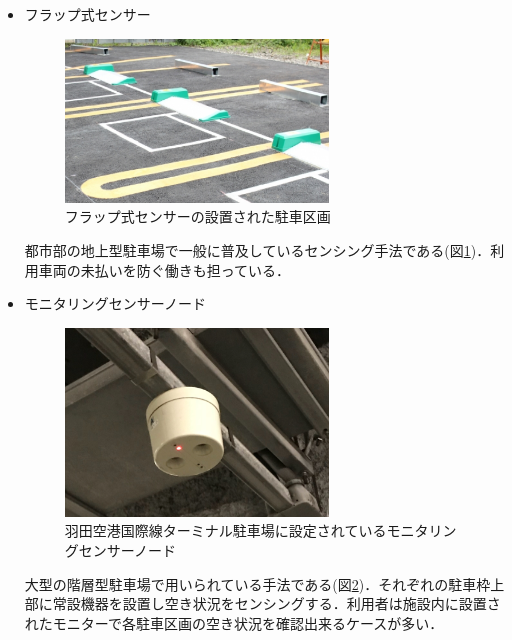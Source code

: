 \begin{itemize}
					
	\item フラップ式センサー\\
	      \begin{figure}
	      	\centering
	      	\includegraphics[width=7cm]{fig/flap.png}
	      	\caption{フラップ式センサーの設置された駐車区画\protect \footnotemark}
	      	\label{flap}
	      \end{figure}
	      都市部の地上型駐車場で一般に普及しているセンシング手法である(図\ref{flap})．利用車両の未払いを防ぐ働きも担っている．
	      	      	      	      	      
	\item モニタリングセンサーノード\\
	      \begin{figure}
	      	\centering
	      	\includegraphics[width=7cm]{fig/sensor-node.png}
	      	\caption{羽田空港国際線ターミナル駐車場に設定されているモニタリングセンサーノード \protect \footnotemark}
	      	\label{sensor-node}
		  \end{figure}
	      大型の階層型駐車場で用いられている手法である(図\ref{sensor-node})．それぞれの駐車枠上部に常設機器を設置し空き状況をセンシングする．利用者は施設内に設置されたモニターで各駐車区画の空き状況を確認出来るケースが多い．
	      	      	      	      	      

\end{itemize}
